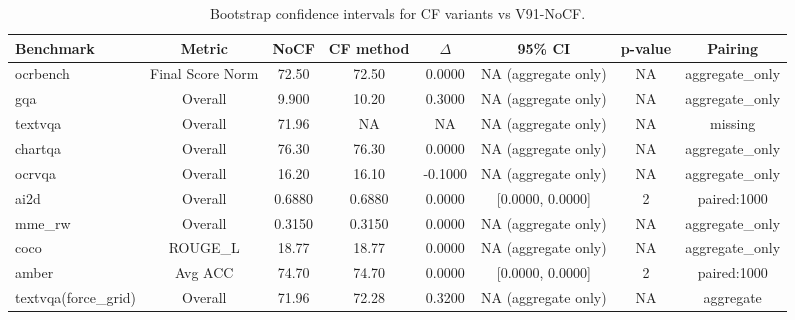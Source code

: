 \begin{table}[t]
\centering
\begin{tabular}{lccccccc}
\toprule
Benchmark & Metric & NoCF & CF method & $\Delta$ & 95\% CI & p-value & Pairing \\
\midrule
ocrbench & Final Score Norm & 72.50 & 72.50 & 0.0000 & NA (aggregate only) & NA & aggregate_only \\
gqa & Overall & 9.900 & 10.20 & 0.3000 & NA (aggregate only) & NA & aggregate_only \\
textvqa & Overall & 71.96 & NA & NA & NA (aggregate only) & NA & missing \\
chartqa & Overall & 76.30 & 76.30 & 0.0000 & NA (aggregate only) & NA & aggregate_only \\
ocrvqa & Overall & 16.20 & 16.10 & -0.1000 & NA (aggregate only) & NA & aggregate_only \\
ai2d & Overall & 0.6880 & 0.6880 & 0.0000 & [0.0000, 0.0000] & 2 & paired:1000 \\
mme_rw & Overall & 0.3150 & 0.3150 & 0.0000 & NA (aggregate only) & NA & aggregate_only \\
coco & ROUGE_L & 18.77 & 18.77 & 0.0000 & NA (aggregate only) & NA & aggregate_only \\
amber & Avg ACC & 74.70 & 74.70 & 0.0000 & [0.0000, 0.0000] & 2 & paired:1000 \\
textvqa(force_grid) & Overall & 71.96 & 72.28 & 0.3200 & NA (aggregate only) & NA & aggregate \\
\bottomrule
\end{tabular}
\caption{Bootstrap confidence intervals for CF variants vs V91-NoCF.}
\label{tab:bootstrap_cf}
\end{table}
